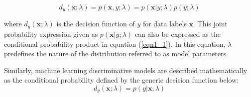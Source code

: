 \begin{equation}
d_y(\mathbf{x};\lambda)=p(\mathbf{x},y;\lambda)=p(\mathbf{x}|y;\lambda)p(y;\lambda)
\label{eqn1_1}
\end{equation}

where $d_y(\mathbf{x};\lambda)$ is the decision function of $y$ for data labels $\mathbf{x}$.  This joint probability expression given as $p(\mathbf{x}|y;\lambda)$ can also be expressed as the conditional probability product in equation (\ref{eqn1_1}).  In this equation, $\lambda$ predefines the nature of the distribution \citep{deng2013machine} referred to as model parameters.

Similarly, machine learning discriminative models are described mathematically as the conditional probability defined by the generic decision function below:
\begin{equation}
d_y(\mathbf{x};\lambda)=p(y|\mathbf{x};\lambda)
\label{eqn1_2}
\end{equation}

